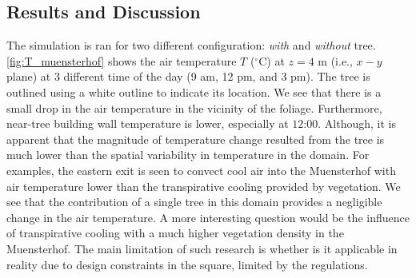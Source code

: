 \subsection{Results and Discussion}

The simulation is ran for two different configuration: \textit{with} and \textit{without} tree. \cref{fig:T_muensterhof} shows the air temperature $T$ ($^{\circ}$C) at $z=4$ m (i.e., $x-y$ plane) at 3 different time of the day (9 am, 12 pm, and 3 pm). The tree is outlined using a white outline to indicate its location. We see that there is a small drop in the air temperature in the vicinity of the foliage. Furthermore, near-tree building wall temperature is lower, especially at $12$:$00$. Although, it is apparent that the magnitude of temperature change resulted from the tree is much lower than the spatial variability in temperature in the domain. For examples, the eastern exit is seen to convect cool air into the Muensterhof with air temperature lower than the transpirative cooling provided by vegetation. We see that the contribution of a single tree in this domain provides a negligible change in the air temperature. A more interesting question would be the influence of transpirative cooling with a much higher vegetation density in the Muensterhof. The main limitation of such research is whether is it applicable in reality due to design constraints in the square, limited by the regulations.

